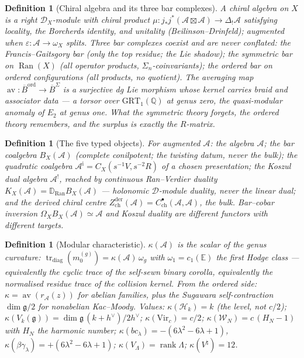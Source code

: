 \documentclass[11pt]{article}
\providecommand{\cA}{\mathcal{A}}
\providecommand{\cH}{\mathcal{H}}
\providecommand{\cW}{\mathcal{W}}
\providecommand{\bQ}{\mathbb{Q}}
\providecommand{\bE}{\mathbb{E}}
\providecommand{\fg}{\mathfrak{g}}
\providecommand{\barB}{\overline{B}}
\providecommand{\Ran}{\operatorname{Ran}}
\providecommand{\Vir}{\mathrm{Vir}}
\providecommand{\Zder}{Z^{\mathrm{der}}_{\mathrm{ch}}}
\providecommand{\av}{\operatorname{av}}
\providecommand{\Dver}{\mathbb{D}}
\newtheorem{definition}[theorem]{Definition}
\begin{document}
\begin{definition}[Chiral algebra and its three bar complexes]
A chiral algebra on $X$ is a right $\mathcal D_X$-module with chiral
product $\mu\colon j_*j^*(\cA\boxtimes\cA)\to\Delta_!\cA$ satisfying
locality, the Borcherds identity, and unitality
\textup{(Beilinson--Drinfeld)}; augmented when
$\varepsilon\colon\cA\to\omega_X$ splits. Three bar complexes coexist
and are never conflated: the Francis--Gaitsgory bar \textup{(only the
top residue; the Lie shadow)}; the symmetric bar on $\Ran(X)$
\textup{(all operator products, $\Sigma_n$-coinvariants)}; the
ordered bar on ordered configurations \textup{(all products, no
quotient)}. The averaging map
$\av\colon\barB^{\mathrm{ord}}\to\barB^{\Sigma}$ is a surjective dg
Lie morphism whose kernel carries braid and associator data --- a
torsor over $\mathrm{GRT}_1(\bQ)$ at genus zero, the quasi-modular
anomaly of $E_2$ at genus one. What the symmetric theory forgets, the
ordered theory remembers, and the surplus is exactly the $R$-matrix.
\end{definition}

\begin{definition}[The five typed objects]
For augmented $\cA$: the algebra $\cA$; the bar coalgebra
$B_X(\cA)$ \textup{(complete conilpotent; the twisting datum, never
the bulk)}; the quadratic coalgebra
$\cA^{\mathrm i}=C_X(s^{-1}V,s^{-2}R)$ of a chosen presentation; the
Koszul dual algebra $\cA^!$, reached by continuous Ran--Verdier
duality $K_X(\cA)=\Dver_{\Ran}B_X(\cA)$ --- holonomic
$\mathcal D$-module duality, never the linear dual; and the derived
chiral centre $\Zder(\cA)=C^\bullet_{\mathrm{ch}}(\cA,\cA)$, the
bulk. Bar--cobar inversion $\Omega_XB_X(\cA)\simeq\cA$ and Koszul
duality are different functors with different targets.
\end{definition}

\begin{definition}[Modular characteristic]
$\kappa(\cA)$ is the scalar of the genus curvature:
$\operatorname{tr}_{\mathrm{diag}}(m_0^{(g)})=\kappa(\cA)\,\omega_g$
with $\omega_1=c_1(\bE)$ the first Hodge class --- equivalently the
cyclic trace of the self-sewn binary corolla, equivalently the
normalised residue trace of the collision kernel. From the ordered
side: $\kappa=\av(r_\cA(z))$ for abelian families, plus the Sugawara
self-contraction $\dim\fg/2$ for nonabelian Kac--Moody. Values:
$\kappa(\cH_k)=k$ \textup{(the level, not $c/2$)};
$\kappa(V_k(\fg))=\dim\fg\,(k+h^\vee)/2h^\vee$;
$\kappa(\Vir_c)=c/2$; $\kappa(\cW_N)=c\,(H_N-1)$ with $H_N$ the
harmonic number; $\kappa(bc_\lambda)=-(6\lambda^2-6\lambda+1)$,
$\kappa(\beta\gamma_\lambda)=+(6\lambda^2-6\lambda+1)$;
$\kappa(V_\Lambda)=\operatorname{rank}\Lambda$;
$\kappa(V^\natural)=12$.
\end{definition}
\end{document}
